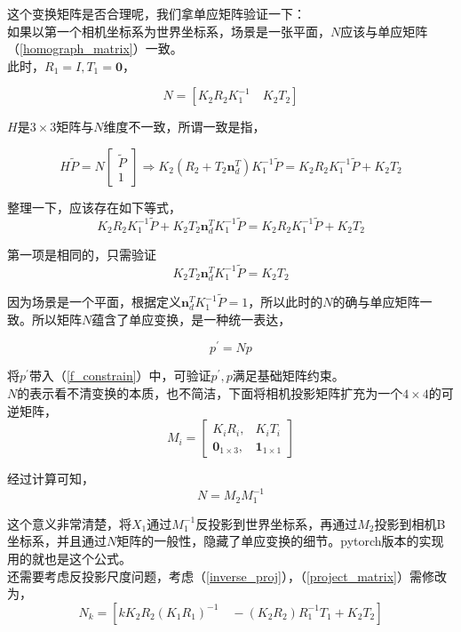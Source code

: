 \documentclass[hpyerref,UTF8,a4paper,titlepage,12pt,oneside]{ctexbook}
\theoremstyle{definition}
\begin{document}
	这个变换矩阵是否合理呢，我们拿单应矩阵验证一下：\\

	如果以第一个相机坐标系为世界坐标系，场景是一张平面，$N$应该与单应矩阵（\ref{homograph_matrix}）一致。\\

	此时，$R_1 = I, T_1 = \mathbf{0}$，

	$$
		N = \left[K_2R_2K_1^{-1} \quad K_2T_2\right]
	$$

	$H$是$3 \times 3$矩阵与$N$维度不一致，所谓一致是指，

	$$
		H\tilde{P} = N
		\begin{bmatrix}
			\tilde{P}\\
			1
		\end{bmatrix} \Rightarrow K_2\left(R_2 + T_2\mathbf{n}_d^T\right)K_1^{-1}\tilde{P} = K_2R_2K_1^{-1}\tilde{P} + K_2T_2
	$$
	
	整理一下，应该存在如下等式，
	$$
		K_2R_2K_1^{-1}\tilde{P} + K_2T_2\mathbf{n}_d^TK_1^{-1}\tilde{P} = K_2R_2K_1^{-1}\tilde{P} + K_2T_2
	$$

	第一项是相同的，只需验证
	$$
		K_2T_2\mathbf{n}_d^TK_1^{-1}\tilde{P} = K_2T_2
	$$

	因为场景是一个平面，根据定义$\mathbf{n}_d^TK_1^{-1}\tilde{P} = 1$，所以此时的$N$的确与单应矩阵一致。所以矩阵$N$蕴含了单应变换，是一种统一表达，

	$$
		p^{\prime} = Np
	$$

	将$p^{\prime}$带入（\ref{f_constrain}）中，可验证$p^{\prime},p$满足基础矩阵约束。\\

	$N$的表示看不清变换的本质，也不简洁，下面将相机投影矩阵扩充为一个$4 \times 4$的可逆矩阵，
	$$
		M_i = \begin{bmatrix}
			K_iR_i,&K_iT_i\\
			\mathbf{0}_{1\times 3},& \mathbf{1}_{1\times 1}
		\end{bmatrix}
	$$

	经过计算可知，
	\begin{equation}
		N = M_2M_1^{-1} \label{simply_N}
	\end{equation}

	这个意义非常清楚，将$X_1$通过$M_1^{-1}$反投影到世界坐标系，再通过$M_2$投影到相机B坐标系，并且通过$N$矩阵的一般性，隐藏了单应变换的细节。pytorch版本的实现用的就也是这个公式。\\

	还需要考虑反投影尺度问题，考虑（\ref{inverse_proj}），（\ref{project_matrix}）需修改为，
	\begin{equation}
		N_k = \left[
					kK_2R_2\left(K_1R_1\right)^{-1} \quad -\left(K_2R_2\right)R_1^{-1}T_1 +K_2T_2 \label{project_matrix}\right]	
	\end{equation}
\end{document}

